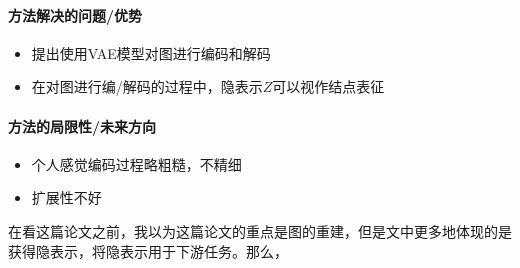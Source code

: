 \paragraph{方法解决的问题/优势}
\begin{itemize}
	\item 提出使用VAE模型对图进行编码和解码
	\item 在对图进行编/解码的过程中，隐表示$Z$可以视作结点表征

\end{itemize}

\paragraph{方法的局限性/未来方向}
\begin{itemize}
	\item 个人感觉编码过程略粗糙，不精细
	\item 扩展性不好
\end{itemize}

在看这篇论文之前，我以为这篇论文的重点是图的重建，但是文中更多地体现的是获得隐表示，将隐表示用于下游任务。那么，



